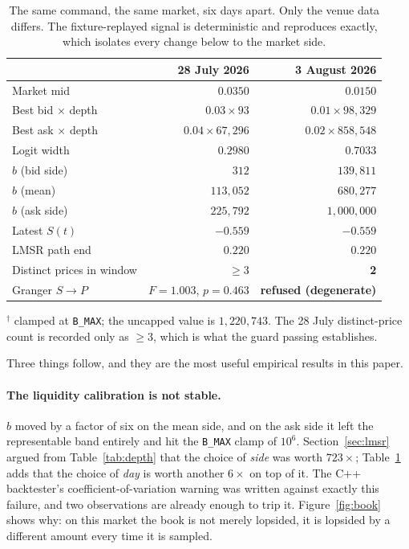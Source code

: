 \documentclass[11pt]{article}
\newcommand{\code}[1]{\texttt{\small #1}}
\begin{document}
\begin{table}[htbp]
\centering
\caption[The same market, six days apart]{The same command, the same market, six days apart. Only the venue data
differs. The fixture-replayed signal is deterministic and reproduces exactly,
which isolates every change below to the market side.}
\label{tab:obs}
\small
\begin{tabular}{@{}lrr@{}}
\toprule
& 28 July 2026 & 3 August 2026 \\
\midrule
Market mid                & $0.0350$ & $0.0150$ \\
Best bid $\times$ depth   & $0.03 \times 93$ & $0.01 \times 98{,}329$ \\
Best ask $\times$ depth   & $0.04 \times 67{,}296$ & $0.02 \times 858{,}548$ \\
Logit width               & $0.2980$ & $0.7033$ \\
\midrule
$b$ (bid side)            & $312$ & $139{,}811$ \\
$b$ (mean)                & $113{,}052$ & $680{,}277$ \\
$b$ (ask side)            & $225{,}792$ & $1{,}000{,}000$\rlap{$^{\dagger}$} \\
\midrule
Latest $S(t)$             & $-0.559$ & $-0.559$ \\
LMSR path end             & $0.220$ & $0.220$ \\
Distinct prices in window & $\ge 3$ & \textbf{2} \\
Granger $S \to P$         & $F=1.003$, $p=0.463$ & \textbf{refused (degenerate)} \\
\bottomrule
\end{tabular}

\vspace{2pt}
{\footnotesize $^{\dagger}$ clamped at \code{B\_MAX}; the uncapped value is
$1{,}220{,}743$. The 28 July distinct-price count is recorded only as
$\ge 3$, which is what the guard passing establishes.}
\end{table}

Three things follow, and they are the most useful empirical results in this
paper.

\paragraph{The liquidity calibration is not stable.} $b$ moved by a factor of six
on the mean side, and on the ask side it left the representable band entirely and
hit the \code{B\_MAX} clamp of $10^{6}$. Section~\ref{sec:lmsr} argued from
Table~\ref{tab:depth} that the choice of \emph{side} was worth $723\times$;
Table~\ref{tab:obs} adds that the choice of \emph{day} is worth another $6\times$
on top of it. The C++ backtester's coefficient-of-variation warning was written
against exactly this failure, and two observations are already enough to trip it.
Figure~\ref{fig:book} shows why: on this market the book is not merely lopsided,
it is lopsided by a different amount every time it is sampled.
\end{document}

